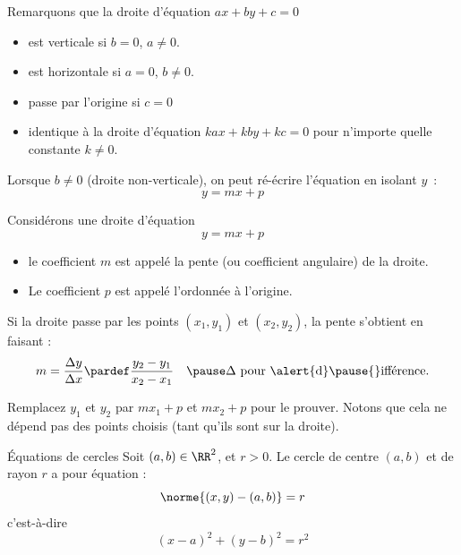 \documentclass[french,xcolor=svgnames]{beamer}
\begin{document}
\begin{frame}
  Remarquons que la droite d'équation $ax+by+c = 0$ \pause
  \begin{itemize}
  \item est verticale\pause{} si $b = 0$, $a \neq 0$.\pause{}
  \item est horizontale\pause{} si $a = 0$, $b \neq 0$.\pause{}
  \item passe par l'origine\pause{} si $c = 0$\pause{}
  \item identique à la droite d'équation\pause{} $kax + kby + kc = 0$ pour n'importe quelle constante $k \neq 0$.\pause{}
  \end{itemize}
  Lorsque $b \neq 0$ (droite non-verticale),\pause{} on peut ré-écrire l'équation en isolant $y$~:
  \begin{equation*}
    y = mx + p
  \end{equation*}
\end{frame}
\begin{frame}Considérons une droite d'équation
  \begin{equation*}
    y = mx + p
  \end{equation*}\pause{}
  \begin{itemize}
  \item le coefficient $m$ est appelé\pause{} la pente (ou coefficient angulaire) de la droite.\pause{}
  \item Le coefficient $p$ est appelé\pause{} l'ordonnée à l'origine.
  \end{itemize}\pause{}
  Si la droite passe par les points $(x_1,y_1)$ et $(x_2,y_2)$,\pause{} la pente s'obtient en faisant :\pause{}
  \begin{equation*}
    m = \frac{\Delta y}{\Delta x} \pardef \frac{y_2-y_1}{x_2-x_1}\quad\pause \text{$\Delta$ pour \alert{d}}\pause{}\text{ifférence.}
  \end{equation*}\pause{}

  \begin{exercise}
    Remplacez $y_1$ et $y_2$ par $m x_1 + p$ et  $m x_2 + p$ pour le prouver.\pause{} Notons que cela ne dépend pas des points choisis (tant qu'ils sont sur la droite).
  \end{exercise}
\end{frame}
\begin{frame}{Équations de cercles}
  Soit $(a,b) \in \RR^{2}$, et $r > 0$.\pause{} Le cercle de centre $(a,b)$ et de rayon $r$ a pour équation :\pause{}
  \begin{equation*}
    \norme{(x,y) - (a,b)} = r
  \end{equation*}\pause{}
  c'est-à-dire\pause{}
  \begin{equation*}
    (x-a)^{2} + (y-b)^{2} = r^{2}
  \end{equation*}
\end{frame}
\end{document}

